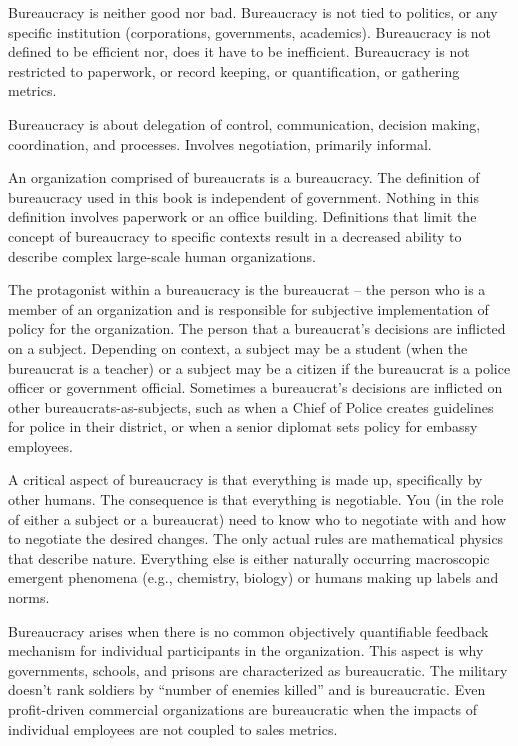 Bureaucracy is neither good nor bad. Bureaucracy is not tied to politics, or any specific institution (corporations, governments, academics). Bureaucracy is not defined to be efficient nor, does it have to be inefficient. Bureaucracy is not restricted to paperwork, or record keeping, or quantification, or gathering metrics. 

Bureaucracy is about delegation of control, communication, decision making, coordination, and processes. Involves negotiation, primarily informal. 

An organization comprised of bureaucrats is a \gls{bureaucracy}. The definition of bureaucracy used in this book is independent of government. Nothing in this definition involves paperwork or an office building. Definitions that limit the concept of bureaucracy to specific contexts result in a decreased ability to describe complex large-scale human organizations. 

The protagonist within a \gls{bureaucracy} is the \gls{bureaucrat} -- the person who is a member of an organization and is responsible for subjective implementation of policy for the organization. The person that a bureaucrat's decisions are inflicted on a \gls{subject}.  Depending on context, a subject may be a student (when the bureaucrat is a teacher) or a subject may be a citizen if the bureaucrat is a police officer or government official. Sometimes a bureaucrat's decisions are inflicted on other bureaucrats-as-subjects, such as when a Chief of Police creates guidelines for police in their district, or when a senior diplomat sets policy for embassy employees. 

A critical aspect of bureaucracy is that everything is made up, specifically by other humans. The consequence is that everything is negotiable. You (in the role of either a subject or a bureaucrat) need to know who to negotiate with and how to negotiate the desired changes. The only actual rules are mathematical physics that describe nature. Everything else is either naturally occurring macroscopic emergent phenomena (e.g., chemistry, biology) or humans making up labels and norms. 

Bureaucracy arises when there is no common objectively quantifiable feedback mechanism for individual participants in the organization. This aspect is why governments, schools, and prisons are characterized as bureaucratic. The military doesn't rank soldiers by ``number of enemies killed'' and is bureaucratic. Even profit-driven commercial organizations are bureaucratic when the impacts of individual employees are not coupled to sales metrics. 

